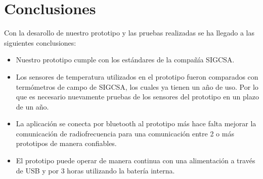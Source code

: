 \section{Conclusiones}

\par \noindent
Con la desarollo de nuestro prototipo y las pruebas realizadas se ha llegado a las siguientes conclusiones:

\begin{itemize}
	\item Nuestro prototipo cumple con los estándares de la compañía SIGCSA. 
	
	\item Los sensores de temperatura utilizados en el prototipo fueron comparados con termómetros de campo de SIGCSA, los cuales ya tienen un año de uso. Por lo que es necesario nuevamente pruebas de los sensores del prototipo en un plazo de un año.
	
	\item La aplicación se conecta por bluetooth al prototipo más hace falta mejorar la comunicación de radiofrecuencia para una comunicación entre 2 o más prototipos de manera confiables.
	
	\item El prototipo puede operar de manera continua con una alimentación a través de USB y por 3 horas utilizando la batería interna.
\end{itemize}

\clearpage

\mbox{}
\clearpage
